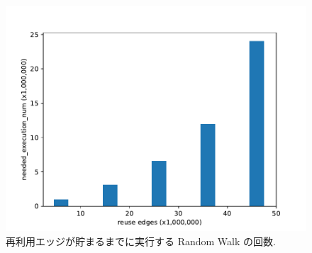 \begin{figure}[t]
    \centering
    \includegraphics[scale=0.8]{figure/AR_cache_RWer_num.pdf}
    \caption{再利用エッジが貯まるまでに実行する Random Walk の回数.}
    \label{再利用エッジが貯まるまでに実行する Random Walk の回数}
\end{figure}